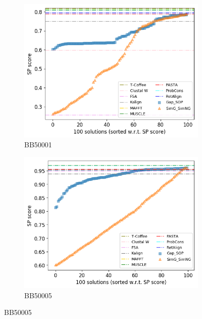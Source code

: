\begin{figure}[!htbp]
	
	\begin{adjustwidth}{-1cm}{-1cm}
		\centering
		\begin{subfigure}{0.22\textwidth}
			\includegraphics[width=\columnwidth]{Figure/summary/precomputedInit/Balibase/BB50001_pairs_density_single_run_2}
			\caption{BB50001}
		\end{subfigure}	
		\begin{subfigure}{0.22\textwidth}
			\includegraphics[width=\columnwidth]{Figure/summary/precomputedInit/Balibase/BB50005_pairs_density_single_run_2}
			\caption{BB50005}

\end{subfigure}
\end{adjustwidth}
\end{figure}
